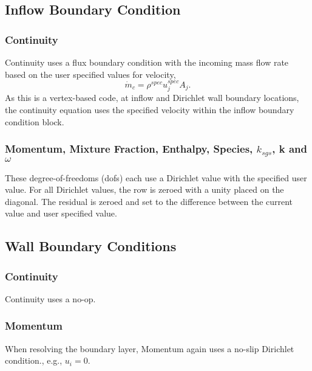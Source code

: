 \subsection{Inflow Boundary Condition}

\subsubsection{Continuity}
Continuity uses a flux boundary condition with the incoming
mass flow rate based on the user specified values for velocity,
\begin{equation}
  \dot{m}_c = \rho^{spec} u^{spec}_j A_j.
\end{equation}
As this is a vertex-based code, at inflow and Dirichlet wall boundary locations,
the continuity equation uses the specified velocity within the inflow boundary condition
block.

\subsubsection{Momentum, Mixture Fraction, Enthalpy, Species, $k_{sgs}$, k and $\omega$}
These degree-of-freedoms (dofs) each use a Dirichlet value with the specified user value.
For all Dirichlet values, the row is zeroed with a unity placed
on the diagonal. The residual is zeroed and set to the difference
between the current value and user specified value.

\subsection{Wall Boundary Conditions}

\subsubsection{Continuity}
Continuity uses a no-op.

\subsubsection{Momentum}
When resolving the boundary layer, Momentum again uses a no-slip 
Dirichlet condition., e.g., $u_i = 0$. 

